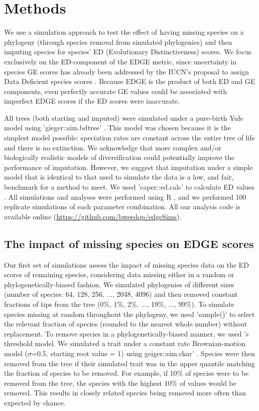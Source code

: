\documentclass[10pt,english]{article}
\begin{document}
\section*{Methods}

We use a simulation approach to test the effect of having missing species
on a phylogeny (through species removal from simulated phylogenies) and then
imputing species for species’ ED (Evolutionary Distinctiveness) scores. We focus
exclusively on the ED-component of the EDGE metric, since uncertainty in species
GE scores has already been addressed by the IUCN’s proposal to assign Data
Deficient species scores \autocite{Iucn2001, Iucn2008}. Because EDGE is the
product of both ED and GE components, even perfectly accurate GE values could be
associated with imperfect EDGE scores if the ED scores were inaccurate.

All trees (both starting and imputed) were simulated under a pure-birth Yule
model using 'gieger::sim.bdtree' \autocite[setting parameters
\texttt{b=1} and \texttt{d=0};][]{Pennell2014}. This model was chosen because it
is the simplest model possible: speciation rates are constant across the entire
tree of life and there is no extinction. We acknowledge that more complex and/or
biologically realistic models of diversification could potentially improve the
performance of imputation. However, we suggest that imputation under a simple
model that is identical to that used to simulate the data is a low, and fair,
benchmark for a method to meet. We used 'caper::ed.calc' to calculate ED
values \autocite{Orme2013}. All simulations and analyses were performed using R
\autocite[version 3.4.0;][]{R2017}, and we performed 100 replicate simulations
of each parameter combination. All our analysis code is available online
(\url{https://github.com/bweedop/edgeSims}).


\subsection*{The impact of missing species on EDGE scores}
Our first set of simulations assess the impact of missing species data on the ED
scores of remaining species, considering data missing either in a random or
phylogenetically-biased fashion. We simulated phylogenies of different sizes
(number of species: 64, 128, 256, ..., 2048, 4096) and then removed constant
fractions of tips from the tree (0\%, 1\%, 2\%, ..., 19\%, ..., 99\%). To
simulate species missing at random throughout the phylogeny, we used 'sample()'
to select the relevant fraction of species (rounded to the nearest whole number)
without replacement. To remove species in a phylogenetically-biased manner, we
used \textcite{Felsenstein2005}'s threshold model. We simulated a trait under a
constant rate Brownian-motion model ($\sigma$=0.5, starting root value = 1)
using geiger::sim.char' \autocite{Pennell2014}. Species were then removed from
the tree if their simulated trait was in the upper quantile matching the
fraction of species to be removed. For example, if 10\% of species were to be
removed from the tree, the species with the highest 10\% of values would be
removed. This results in closely related species being removed more often than
expected by chance.
\end{document}
